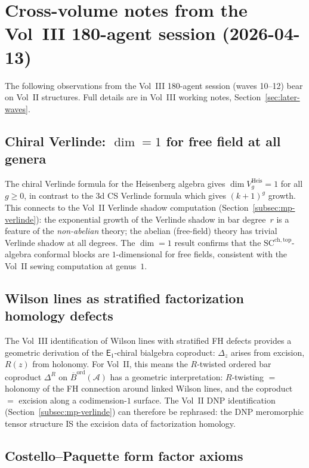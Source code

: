 \documentclass[11pt]{article}
\newcommand{\cA}{\mathcal{A}}
\newcommand{\barB}{\overline{B}}
\newcommand{\Eone}{\mathsf{E}_1}
\begin{document}
\section{Cross-volume notes from the Vol~III 180-agent session (2026-04-13)}
\label{sec:vol3-cross-refs}

The following observations from the Vol~III 180-agent session
(waves 10--12) bear on Vol~II structures. Full details are in
Vol~III working notes, Section~\ref*{sec:later-waves}.

\subsection{Chiral Verlinde: $\dim = 1$ for free field at all genera}

The chiral Verlinde formula for the Heisenberg algebra gives
$\dim V_g^{\mathrm{Heis}} = 1$ for all $g \geq 0$, in contrast
to the 3d CS Verlinde formula which gives $(k+1)^g$ growth.  This
connects to the Vol~II Verlinde shadow computation
(Section~\ref{subsec:mp-verlinde}): the exponential growth of the
Verlinde shadow in bar degree~$r$ is a feature of the
\emph{non-abelian} theory; the abelian (free-field) theory has
trivial Verlinde shadow at all degrees.  The $\dim = 1$ result
confirms that the $\mathrm{SC}^{\mathrm{ch,top}}$-algebra conformal
blocks are $1$-dimensional for free fields, consistent with the
Vol~II sewing computation at genus~$1$.

\subsection{Wilson lines as stratified factorization homology defects}

The Vol~III identification of Wilson lines with stratified FH defects
provides a geometric derivation of the $\Eone$-chiral bialgebra
coproduct: $\Delta_z$ arises from excision, $R(z)$ from holonomy.
For Vol~II, this means the $R$-twisted ordered bar coproduct
$\Delta^R$ on $\barB^{\mathrm{ord}}(\cA)$ has a geometric
interpretation: $R$-twisting $=$ holonomy of the FH connection
around linked Wilson lines, and the coproduct $=$ excision along
a codimension-$1$ surface.  The Vol~II DNP identification
(Section~\ref{subsec:mp-verlinde}) can therefore be rephrased:
the DNP meromorphic tensor structure IS the excision data of
factorization homology.

\subsection{Costello--Paquette form factor axioms}
\end{document}
